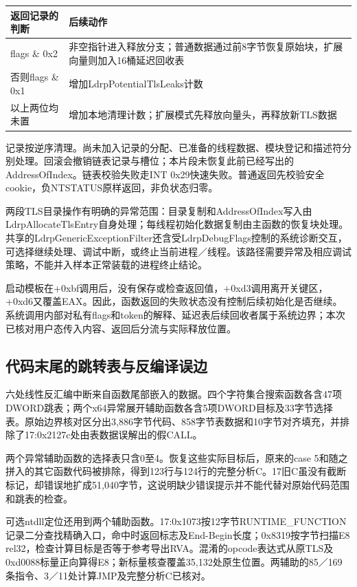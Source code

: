 \documentclass[UTF8,a4paper,zihao=5,fontset=windows]{ctexart}
\newcommand{\code}[1]{{\ttfamily\small #1}}
\begin{document}
\begin{longtable}{@{}L{36mm}L{114mm}@{}}\toprule 返回记录的判断 & 后续动作\\\midrule\endhead
\code{flags \& 0x2} & 非空指针进入释放分支；普通数据通过前8字节恢复原始块，扩展向量则加入16桶延迟回收表\\
否则\code{flags \& 0x1} & 增加\code{LdrpPotentialTlsLeaks}计数\\
以上两位均未置 & 增加本地清理计数；扩展模式先释放向量头，再释放新TLS数据\\\bottomrule\end{longtable}

记录按逆序清理。尚未加入记录的分配、已准备的线程数据、模块登记和描述符分别处理。回滚会撤销链表记录与槽位；本片段未恢复此前已经写出的\code{*AddressOfIndex}。链表校验失败走\code{INT 0x29}快速失败。普通返回先校验安全cookie，负\code{NTSTATUS}原样返回，非负状态归零。

两段TLS目录操作有明确的异常范围：目录复制和\code{AddressOfIndex}写入由\code{LdrpAllocateTlsEntry}自身处理；每线程初始化数据复制由主函数的恢复块处理。共享的\code{LdrpGenericExceptionFilter}还含受\code{LdrpDebugFlags}控制的系统诊断交互，可选择继续处理、调试中断，或终止当前进程／线程。该路径需要异常及相应调试策略，不能并入样本正常装载的进程终止结论。

启动模板在\code{+0xbf}调用后，没有保存或检查返回值，\code{+0xd3}调用离开关键区，\code{+0xd6}又覆盖\code{EAX}。因此，函数返回的失败状态没有控制后续初始化是否继续。系统调用内部对私有flags和token的解释、延迟表后续回收者属于系统边界；本次已核对用户态传入内容、返回后分流与实际释放位置。

\subsection{代码末尾的跳转表与反编译误边}
六处线性反汇编中断来自函数尾部嵌入的数据。四个字符集合搜索函数各含47项DWORD跳表；两个x64异常展开辅助函数各含5项DWORD目标及33字节选择表。原始边界核对区分出3,886字节代码、858字节表数据和10字节对齐填充，并排除了\code{17:0x2127c}处由表数据误解出的假CALL。

两个异常辅助函数的选择表只含0至4。恢复这些实际目标后，原来的\code{case 5}和随之拼入的其它函数代码被排除，得到123行与124行的完整分析C。17旧C虽没有截断标记，却错误地扩成51,040字节，这说明缺少错误提示并不能代替对原始代码范围和跳表的检查。

可选ntdll定位还用到两个辅助函数。\code{17:0x1073}按12字节\code{RUNTIME\_FUNCTION}记录二分查找精确入口，命中时返回标志及\code{End-Begin}长度；\code{0x8319}按字节扫描\code{E8 rel32}，检查计算目标是否等于参考导出RVA。混淆的opcode表达式从原TLS及\code{0xd0088}标量正向算得\code{E8}；新标量核查覆盖35,132处原生位置。两辅助的85／169条指令、3／11处计算JMP及完整分析C已核对。
\end{document}

